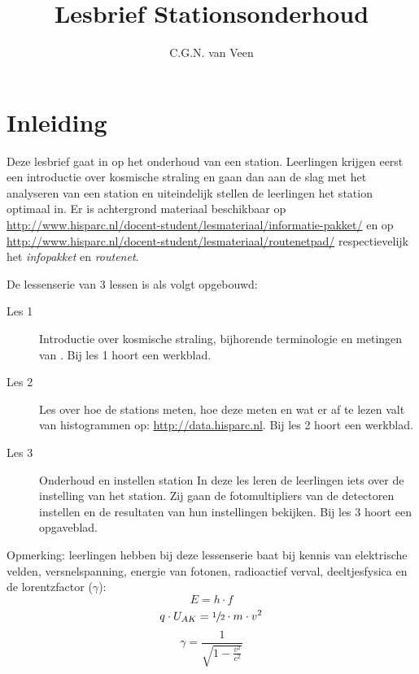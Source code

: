 
\usepackage{xfrac}

\title{Lesbrief Stationsonderhoud}
\author{C.G.N. van Veen}



\maketitle

\section{Inleiding}

Deze lesbrief gaat in op het onderhoud van een \hisparc station.
Leerlingen krijgen eerst een introductie over kosmische straling en gaan
dan aan de slag met het analyseren van een \hisparc station en
uiteindelijk stellen de leerlingen het station optimaal in. Er is
achtergrond materiaal beschikbaar op
\url{http://www.hisparc.nl/docent-student/lesmateriaal/informatie-pakket/} en 
op \url{http://www.hisparc.nl/docent-student/lesmateriaal/routenetpad/} respectievelijk 
het \textit{infopakket} en \textit{routenet}.

De lessenserie van 3 lessen is als volgt opgebouwd:
\begin{description}
    \item[Les 1] Introductie over kosmische straling, bijhorende terminologie en metingen van \hisparc.
    Bij les 1 hoort een werkblad.

    \item[Les 2] Les over hoe de stations meten, hoe deze meten en wat er af te lezen valt van 
    histogrammen op: \url{http://data.hisparc.nl}.  
    Bij les 2 hoort een werkblad. 
 
    \item[Les 3] Onderhoud en instellen station
    In deze les leren de leerlingen iets over de instelling van het \hisparc station.
    Zij gaan de fotomultipliers van de detectoren instellen en de resultaten van 
    hun instellingen bekijken. Bij les 3 hoort een opgaveblad.
\end{description}

Opmerking: leerlingen hebben bij deze lessenserie baat bij kennis van 
elektrische velden, versnelspanning, energie van fotonen, radioactief verval, 
deeltjesfysica en de lorentzfactor ($\gamma$):
\begin{equation}
    E = h \cdot f 
\end{equation}
\begin{equation}
    q \cdot {U_{AK}} = \sfrac{1}{2} \cdot m \cdot {v^2}
\end{equation}
\begin{equation}
    \gamma = \frac{1}{\sqrt{1-\frac{v^2}{c^2}}}
\end{equation}

